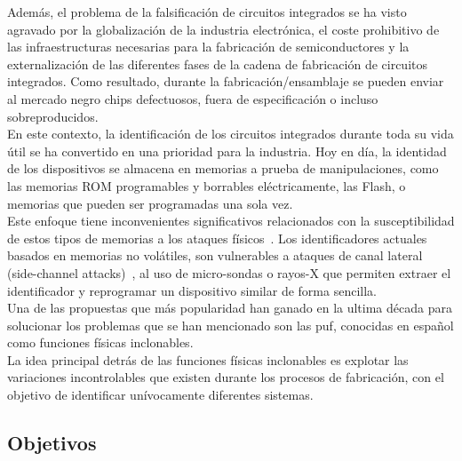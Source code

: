 \documentclass[spanish]{template/minim}
\begin{document}
Además, el problema de la falsificación de circuitos integrados se ha visto agravado por la globalización de la industria electrónica, el coste prohibitivo de las infraestructuras necesarias para la fabricación de semiconductores y la externalización de las diferentes fases de la cadena de fabricación de circuitos integrados. Como resultado, durante la fabricación/ensamblaje se pueden enviar al mercado negro chips defectuosos, fuera de especificación o incluso sobreproducidos.\\

En este contexto, la identificación de los circuitos integrados durante toda su vida útil se ha convertido en una prioridad para la industria. Hoy en día, la identidad de los dispositivos se almacena en memorias a prueba de manipulaciones, como las memorias ROM programables y borrables eléctricamente, las Flash, o memorias que pueden ser programadas una sola vez.\\

Este enfoque tiene inconvenientes significativos relacionados con la susceptibilidad de estos tipos de memorias a los ataques físicos~. Los identificadores actuales basados en memorias no volátiles, son vulnerables a ataques de canal lateral (side-channel attacks)~, al uso de micro-sondas o rayos-X que permiten extraer el identificador y reprogramar un dispositivo similar de forma sencilla.\\

Una de las propuestas que más popularidad han ganado en la ultima década para solucionar los problemas que se han mencionado son las \gls{puf}, conocidas en español como funciones físicas inclonables.\\

La idea principal detrás de las funciones físicas inclonables es explotar las variaciones incontrolables que existen durante los procesos de fabricación, con el objetivo de identificar unívocamente diferentes sistemas.\\

\subsection{Objetivos}\label{sec:objectives}
\end{document}
